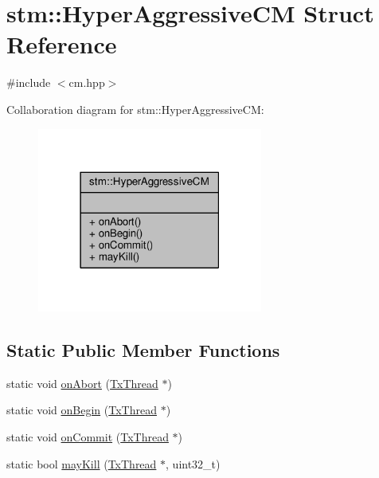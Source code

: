 \hypertarget{structstm_1_1HyperAggressiveCM}{\section{stm\-:\-:Hyper\-Aggressive\-C\-M Struct Reference}
\label{structstm_1_1HyperAggressiveCM}
}


{\ttfamily \#include $<$cm.\-hpp$>$}



Collaboration diagram for stm\-:\-:Hyper\-Aggressive\-C\-M\-:
\nopagebreak
\begin{figure}[H]
\begin{center}
\leavevmode
\includegraphics[width=210pt]{structstm_1_1HyperAggressiveCM__coll__graph}
\end{center}
\end{figure}
\subsection*{Static Public Member Functions}
\begin{DoxyCompactItemize}
\item 
static void \hyperlink{structstm_1_1HyperAggressiveCM_a4318491b0620ba6f87558a6dccb16bf0}{on\-Abort} (\hyperlink{structstm_1_1TxThread}{Tx\-Thread} $\ast$)
\item 
static void \hyperlink{structstm_1_1HyperAggressiveCM_a839f5b2cc51987b10b7c5cc920aa15f1}{on\-Begin} (\hyperlink{structstm_1_1TxThread}{Tx\-Thread} $\ast$)
\item 
static void \hyperlink{structstm_1_1HyperAggressiveCM_a3a51fad00edf2296458700eb206245d9}{on\-Commit} (\hyperlink{structstm_1_1TxThread}{Tx\-Thread} $\ast$)
\item 
static bool \hyperlink{structstm_1_1HyperAggressiveCM_aac31351b24fba3393c7bf2afcf88c4cf}{may\-Kill} (\hyperlink{structstm_1_1TxThread}{Tx\-Thread} $\ast$, uint32\-\_\-t)
\end{DoxyCompactItemize}



